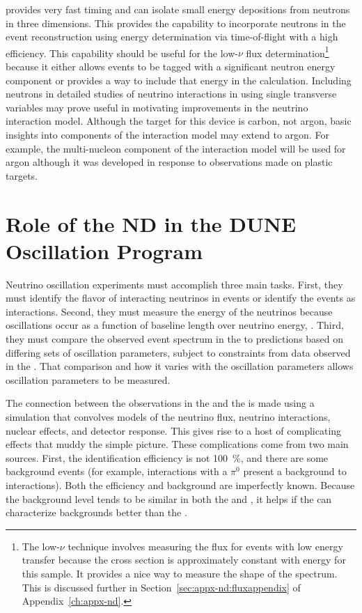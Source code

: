  provides very fast timing and can isolate small energy depositions from neutrons in three dimensions.  This provides the capability to  incorporate neutrons in the event reconstruction using energy determination via time-of-flight with a high efficiency. This capability should be useful for the low-$\nu$ flux determination\footnote{The low-$\nu$ technique involves measuring the flux for events with low energy transfer because the cross section is approximately constant with energy for this sample.  It provides a nice way to measure the shape of the spectrum.  This is discussed further in Section~\ref{sec:appx-nd:fluxappendix} of Appendix~\ref{ch:appx-nd}.} because it either allows events to be tagged with a significant neutron energy component or provides a way to include that energy in the calculation.  Including neutrons in detailed studies of neutrino interactions in   using single transverse variables may prove useful in motivating improvements in the neutrino interaction model. Although the target for this device is carbon, not argon, basic insights into components of the interaction model may extend to argon.  For example, the multi-nucleon component of the interaction model will be used for argon although it was developed in response to observations made on plastic targets.   



\section{Role of the ND in the DUNE Oscillation Program}
\label{sec:exsum-nd-role}

Neutrino oscillation experiments must accomplish three main tasks. First, they must identify the flavor of interacting neutrinos in  events or identify the events as  interactions. Second, they must measure the energy of the neutrinos because oscillations occur as a function of baseline length over neutrino energy, . Third, they must compare the observed event spectrum in the  to  predictions based on differing sets of oscillation parameters, subject to constraints from data observed in the .  That comparison and how it varies with the oscillation parameters allows oscillation parameters to be measured.

The connection between the observations in the  and the  is made using a simulation that convolves models of the neutrino flux, neutrino interactions, nuclear effects, and detector response.
This gives rise to a host of complicating effects that 
muddy the simple picture. These complications come from two main sources. First, the identification efficiency is not \SI{100}{\%}, and there are
some background events (for example,  interactions with a $\pi^0$ present %
a background to \nue {} interactions). Both the efficiency and background are imperfectly known. 
Because the background level tends to be similar in both the  and , it helps if the  can characterize backgrounds better than the . 

